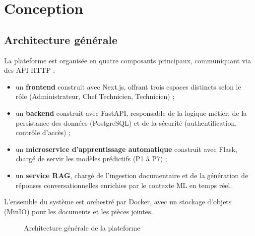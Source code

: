 \chapter{Conception}

\section{Architecture générale}

La plateforme est organisée en quatre composants principaux, communiquant via des API HTTP :
\begin{itemize}
\item un \textbf{frontend} construit avec Next.js, offrant trois espaces distincts selon le rôle (Administrateur, Chef Technicien, Technicien) ;
\item un \textbf{backend} construit avec FastAPI, responsable de la logique métier, de la persistance des données (PostgreSQL) et de la sécurité (authentification, contrôle d'accès) ;
\item un \textbf{microservice d'apprentissage automatique} construit avec Flask, chargé de servir les modèles prédictifs (P1 à P7) ;
\item un \textbf{service RAG}, chargé de l'ingestion documentaire et de la génération de réponses conversationnelles enrichies par le contexte ML en temps réel.
\end{itemize}

L'ensemble du système est orchestré par Docker, avec un stockage d'objets (MinIO) pour les documents et les pièces jointes.

\begin{figure}[h]
\centering
{}
\caption{Architecture générale de la plateforme}
\label{fig:architecture}
\end{figure}

